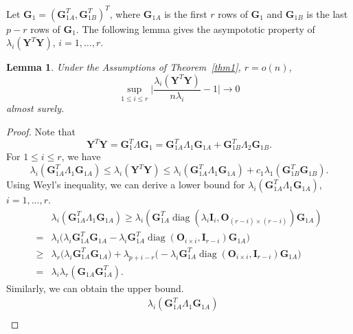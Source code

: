 \documentclass[12pt]{article} %
\DeclareMathOperator{\mydiag}{diag}
\newcommand{\bA}{\mathbf{A}}
\newcommand{\bY}{\mathbf{Y}}
\newcommand{\bG}{\mathbf{G}}
\newcommand{\bO}{\mathbf{O}}
\newcommand{\bI}{\mathbf{I}}
\newcommand{\bD}{\mathbf{D}}
\newcommand{\bV}{\mathbf{V}}
\newtheorem{lemma}{Lemma}
\theoremstyle{definition}
\begin{document}
Let $\bG_1=(\bG_{1A}^T,\bG_{1B}^T)^T$, where $\bG_{1A}$ is the first $r$ rows of $\bG_1$ and $\bG_{1B}$ is the last $p-r$ rows of $\bG_1$.
The following lemma gives the asympototic property of $\lambda_{i}(\bY^T \bY)$, $i=1,\ldots, r$.
\begin{lemma}\label{PCAlemma1}
    Under the Assumptions of Theorem~\ref{thm1}, $r=o(n)$,
    $$\sup_{1\leq i\leq r}\Big|\frac{\lambda_{i}(\bY^T \bY)}{n\lambda_i}-1\Big|\to 0$$
    almost surely.
\end{lemma}
\begin{proof}
    Note that
$$
\bY^T \bY =\bG_1^T \Lambda \bG_1
=
\bG_{1A}^T \Lambda_1 \bG_{1A}+
\bG_{1B}^T \Lambda_2 \bG_{1B}.
$$
For $1\leq i \leq r$, we have
    \begin{equation}\label{eq:DLU}
\lambda_i(\bG_{1A}^T \Lambda_1 \bG_{1A})
    \leq \lambda_i(\bY^T \bY) \leq \lambda_i(\bG_{1A}^T \Lambda_1 \bG_{1A})+
    c_1 \lambda_1(\bG_{1B}^T  \bG_{1B}).
    \end{equation}
 Using Weyl's inequality, we can derive a lower bound for $\lambda_i(\bG_{1A}^T \Lambda_1 \bG_{1A})$, $ i=1,\ldots, r$.
\begin{equation}\label{eq:DLower}
\begin{aligned}
&\lambda_i(\bG_{1A}^T \Lambda_1 \bG_{1A})
\geq
\lambda_i(\bG_{1A}^T \mydiag(\lambda_i \bI_{i},\bO_{(r-i)\times(r-i)}) \bG_{1A})
\\
    =&
    \lambda_i\Big( \lambda_i \bG_{1A}^T \bG_{1A}-\lambda_i\bG_{1A}^T \mydiag(\bO_{i\times i}, \bI_{r-i}) \bG_{1A}\Big)\\
    \geq&
    \lambda_r\Big( \lambda_i \bG_{1A}^T \bG_{1A}\Big)+\lambda_{p+i-r}\Big(-\lambda_i\bG_{1A}^T \mydiag(\bO_{i\times i}, \bI_{r-i}) \bG_{1A}\Big)\\
= &
\lambda_i \lambda_r(\bG_{1A}\bG_{1A}^T).
\end{aligned}
\end{equation}
Similarly, we can obtain the upper bound.
\begin{equation}\label{eq:DUpper}
\begin{aligned}
&\lambda_i(\bG_{1A}^T \Lambda_1 \bG_{1A})
\\

\end{aligned}
\end{equation}
\end{proof}
\end{document}
